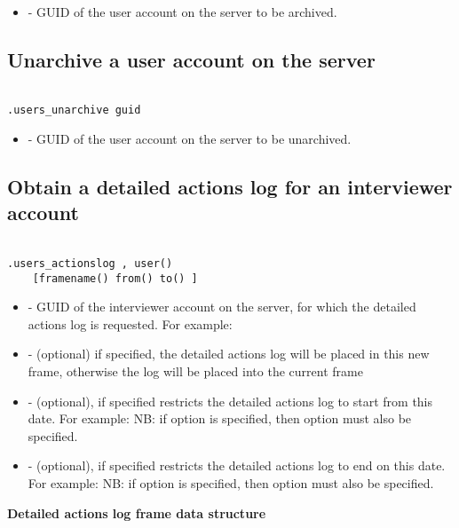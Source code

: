 \paramsheader
\begin{itemize}
      \item {} - GUID of the user account on the server to be
      archived.
\end{itemize}


\subsection{Unarchive a user account on the server}
\begin{lstlisting}[style=CommandLineStyle, showlines=true]

.users_unarchive guid

\end{lstlisting}

\paramsheader
\begin{itemize}

      \item {} - GUID of the user account on the server to be
      unarchived.

\end{itemize}


\subsection{Obtain a detailed actions log for an interviewer account}
\begin{lstlisting}[style=CommandLineStyle, showlines=true]

.users_actionslog , user()
    [framename() from() to() ]

\end{lstlisting}

\optsheader
\begin{itemize}

      \item {} - GUID of the interviewer account on the server, for
      which the detailed actions log is requested. For example:

      \item {} - (optional) if specified, the detailed actions
      log will be placed in this new frame, otherwise the log will be placed
      into the current frame

      \item {} - (optional), if specified restricts the detailed
      actions log to start from this date. For example:
      \newline
      NB: if option  is specified, then option 
      must also be specified.

      \item {} - (optional), if specified restricts the detailed
      actions log to end on this date. For example:
       \newline
      NB: if option  is specified, then option 
      must also be specified.

\end{itemize}

\textbf{Detailed actions log frame data structure}

\begin{compactitem}
\end{compactitem}
